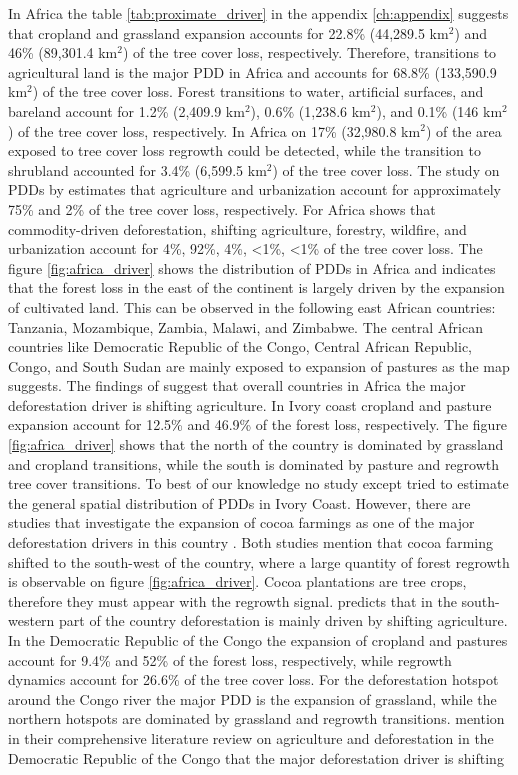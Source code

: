 			In Africa the table \ref{tab:proximate_driver} in the appendix \ref{ch:appendix} suggests that cropland and grassland expansion accounts for 22.8\% (44,289.5 km$^2$) and 46\% (89,301.4 km$^2$) of the tree cover loss, respectively. Therefore, transitions to agricultural land is the major \ac{PDD} in Africa and accounts for 68.8\% (133,590.9 km$^2$) of the tree cover loss. Forest transitions to water, artificial surfaces, and bareland account for 1.2\% (2,409.9 km$^2$), 0.6\% (1,238.6 km$^2$), and 0.1\% (146 km$^2$) of the tree cover loss, respectively. In Africa on 17\% (32,980.8 km$^2$) of the area exposed to tree cover loss regrowth could be detected, while the transition to shrubland accounted for 3.4\% (6,599.5 km$^2$) of the tree cover loss. The study on \acp{PDD} by \citet{Hosonuma2012} estimates that agriculture and urbanization account for approximately 75\% and 2\% of the tree cover loss, respectively. For Africa \citet{Curtis2018} shows that commodity-driven deforestation, shifting agriculture, forestry, wildfire, and urbanization account for 4\%, 92\%, 4\%, <1\%, <1\% of the tree cover loss. The figure \ref{fig:africa_driver} shows the distribution of \acp{PDD} in Africa and indicates that the forest loss in the east of the continent is largely driven by the expansion of cultivated land. This can be observed in the following east African countries: Tanzania, Mozambique, Zambia, Malawi, and Zimbabwe. The central African countries like Democratic Republic of the Congo, Central African Republic, Congo, and South Sudan are mainly exposed to expansion of pastures as the map suggests. The findings of \citet{Curtis2018} suggest that overall countries in Africa the major deforestation driver is shifting agriculture. In Ivory coast cropland and pasture expansion account for 12.5\% and 46.9\% of the forest loss, respectively. The figure \ref{fig:africa_driver} shows that the north of the country is dominated by grassland and cropland transitions, while the south is dominated by pasture and regrowth tree cover transitions. To best of our knowledge no study except \citet{Curtis2018} tried to estimate the general spatial distribution of \acp{PDD} in Ivory Coast. However, there are studies that investigate the expansion of cocoa farmings as one of the major deforestation drivers in this country \citep{Barima2016,Ruf2014}. Both studies mention that cocoa farming shifted to the south-west of the country, where a large quantity of forest regrowth is observable on figure \ref{fig:africa_driver}. Cocoa plantations are tree crops, therefore they must appear with the regrowth signal. \citet{Curtis2018} predicts that in the south-western part of the country deforestation is mainly driven by shifting agriculture. In the Democratic Republic of the Congo the expansion of cropland and pastures account for 9.4\% and 52\% of the forest loss, respectively, while regrowth dynamics account for 26.6\% of the tree cover loss. For the deforestation hotspot around the Congo river the major \ac{PDD} is the expansion of grassland, while the northern hotspots are dominated by grassland and regrowth transitions. \citet{Ickowitz2015} mention in their comprehensive literature review on agriculture and deforestation in the Democratic Republic of the Congo that the major deforestation driver is shifting 